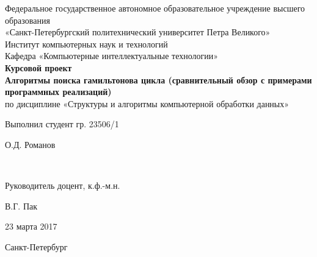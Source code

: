 \begin{titlepage}

	\begin{center}

		\large Федеральное государственное автономное образовательное учреждение высшего образования \\
		\large «Санкт-Петербургский политехнический университет Петра Великого» \\
		\large Институт компьютерных наук и технологий \\
		\large Кафедра «Компьютерные интеллектуальные технологии» \\[4cm]

		\huge {\bf Курсовой проект} \\[0.5cm]
		\large {\bf Алгоритмы поиска гамильтонова цикла (сравнительный обзор с примерами программных реализаций)} \\[0.1cm]
		\large по дисциплине «Структуры и алгоритмы компьютерной обработки данных» \\[4cm]

	\end{center}

    \begin{center}
        \begin{minipage}[t]{4cm}
            \begin{flushleft}
                Выполнил студент гр. 23506/1
            \end{flushleft}
        \end{minipage}
        \hfill
        \begin{minipage}[t]{4cm}
            \begin{flushright}
            О.Д. Романов
            \end{flushright}
        \end{minipage} \\[0.5cm]

        \begin{minipage}[t]{4cm}
            \begin{flushleft}
                Руководитель доцент, к.ф.-м.н.
            \end{flushleft}
            \flushleft
        \end{minipage}
        \hfill
        \begin{minipage}[t]{4cm}
            \begin{flushright}
                В.Г. Пак
            \end{flushright}
        \end{minipage}
    \end{center}

    \begin{flushright}
        23 марта 2017
    \end{flushright}

	
	\vfill

	\begin{center}
	    \large Санкт-Петербург\\
	    \large \the\year
	\end{center}
 
\end{titlepage}